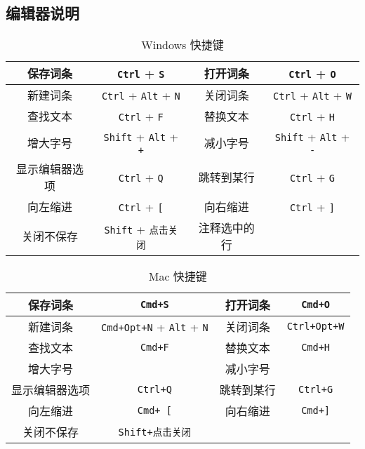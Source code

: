 \subsection{编辑器说明}
\begin{table}[ht]
\centering
\caption{Windows 快捷键}\label{tab_editor_1}
\begin{tabular}{|c|c|c|c|}
\hline
保存词条 & \verb|Ctrl| + \verb|S| & 打开词条 & \verb|Ctrl| + \verb|O| \\
\hline
新建词条 & \verb|Ctrl| + \verb|Alt| + \verb|N| & 关闭词条 & \verb|Ctrl| + \verb|Alt| + \verb|W| \\
\hline
查找文本 & \verb|Ctrl| + \verb|F| & 替换文本 & \verb|Ctrl| + \verb|H| \\
\hline
增大字号 & \verb|Shift| + \verb|Alt| + \verb|+| & 减小字号 & \verb|Shift| + \verb|Alt| + \verb|-| \\
\hline
显示编辑器选项 & \verb|Ctrl| + \verb|Q| & 跳转到某行 & \verb|Ctrl| + \verb|G| \\
\hline
向左缩进 & \verb|Ctrl| + \verb|[| & 向右缩进 & \verb|Ctrl| + \verb|]| \\
\hline
关闭不保存 & \verb|Shift| + \verb|点击关闭| & 注释选中的行 &  \\
\hline
\end{tabular}
\end{table}

\begin{table}[ht]
\centering
\caption{Mac 快捷键}\label{tab_editor_2}
\begin{tabular}{|c|c|c|c|}
\hline
保存词条 & \verb|Cmd+S| & 打开词条 & \verb|Cmd+O| \\
\hline
新建词条 & \verb|Cmd+Opt+N| + \verb|Alt| + \verb|N| & 关闭词条 & \verb|Ctrl+Opt+W| \\
\hline
查找文本 & \verb|Cmd+F| & 替换文本 & \verb|Cmd+H| \\
\hline
增大字号 &  & 减小字号 & \\
\hline
显示编辑器选项 & \verb|Ctrl+Q| & 跳转到某行 & \verb|Ctrl+G| \\
\hline
向左缩进 & \verb|Cmd+ [| & 向右缩进 & \verb|Cmd+]| \\
\hline
关闭不保存 & \verb|Shift+点击关闭| &  &  \\
\hline
\end{tabular}
\end{table}

